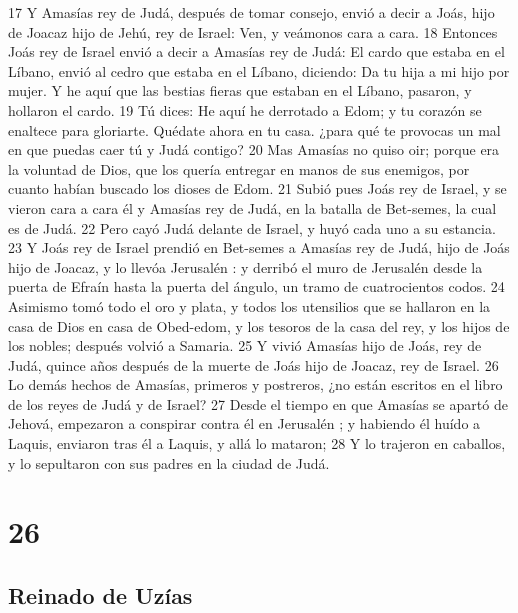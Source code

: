 17 Y Amasías rey de Judá, después de tomar consejo, envió a decir a Joás, hijo de Joacaz hijo de Jehú, rey de Israel: Ven, y veámonos cara a cara.
18 Entonces Joás rey de Israel envió a decir a Amasías rey de Judá: El cardo que estaba en el Líbano, envió al cedro que estaba en el Líbano, diciendo: Da tu hija a mi hijo por mujer. Y he aquí que las bestias fieras que estaban en el Líbano, pasaron, y hollaron el cardo.
19 Tú dices: He aquí he derrotado a Edom; y tu corazón se enaltece para gloriarte. Quédate ahora en tu casa. ¿para qué te provocas un mal en que puedas caer tú y Judá contigo?
20 Mas Amasías no quiso oir; porque era la voluntad de Dios, que los quería entregar en manos de sus enemigos, por cuanto habían buscado los dioses de Edom.
21 Subió pues Joás rey de Israel, y se vieron cara a cara él y Amasías rey de Judá, en la batalla de Bet-semes, la cual es de Judá.
22 Pero cayó Judá delante de Israel, y huyó cada uno a su estancia.
23 Y Joás rey de Israel prendió en Bet-semes a Amasías rey de Judá, hijo de Joás hijo de Joacaz, y lo  llevóa Jerusalén : y derribó el muro de Jerusalén  desde la puerta de Efraín hasta la puerta del ángulo, un tramo de cuatrocientos codos.
24 Asimismo tomó todo el oro y plata, y todos los utensilios que se hallaron en la casa de Dios en casa de Obed-edom, y los tesoros de la casa del rey, y los hijos de los nobles; después volvió a Samaria.
25 Y vivió Amasías hijo de Joás, rey de Judá, quince años después de la muerte de Joás hijo de Joacaz, rey de Israel.
26 Lo demás hechos de Amasías, primeros y postreros, ¿no están escritos en el libro de los reyes de Judá y de Israel?
27 Desde el tiempo en que Amasías se apartó de Jehová, empezaron a conspirar contra él en Jerusalén ; y habiendo él huído a Laquis, enviaron tras él a Laquis, y allá lo mataron;
28 Y lo trajeron en caballos, y lo sepultaron con sus padres en la ciudad de Judá.

\chapter{26}

\section*{Reinado de Uzías}

